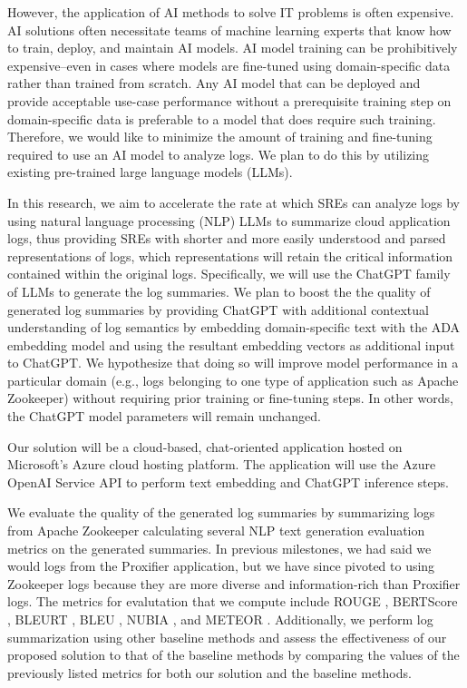 \documentclass[conference]{IEEEtran}
\begin{document}
However, the application of AI methods to solve IT problems is often expensive. \cite{LEE2023110689} \cite{network-log-anomaly-detection} AI solutions often necessitate teams of machine learning experts that know how to train, deploy, and maintain AI models. \cite{aiops-challenges} AI model training can be prohibitively expensive--even in cases where models are fine-tuned using domain-specific data rather than trained from scratch. Any AI model that can be deployed and provide acceptable use-case performance without a prerequisite training step on domain-specific data is preferable to a model that does require such training. Therefore, we would like to minimize the amount of training and fine-tuning required to use an AI model to analyze logs. We plan to do this by utilizing existing pre-trained large language models (LLMs).

In this research, we aim to accelerate the rate at which SREs can analyze logs by using natural language processing (NLP) LLMs to summarize cloud application logs, thus providing SREs with shorter and more easily understood and parsed representations of logs, which representations will retain the critical information contained within the original logs. \cite{medium-text-summarization} Specifically, we will use the ChatGPT family of LLMs to generate the log summaries. We plan to boost the the quality of generated log summaries by providing ChatGPT with additional contextual understanding of log semantics by embedding domain-specific text with the ADA embedding model and using the resultant embedding vectors as additional input to ChatGPT. We hypothesize that doing so will improve model performance in a particular domain (e.g., logs belonging to one type of application such as Apache Zookeeper) without requiring prior training or fine-tuning steps. In other words, the ChatGPT model parameters will remain unchanged.

Our solution will be a cloud-based, chat-oriented application hosted on Microsoft's Azure cloud hosting platform. The application will use the Azure OpenAI Service API to perform text embedding and ChatGPT inference steps.

We evaluate the quality of the generated log summaries by summarizing logs from Apache Zookeeper \cite{zookeeper} calculating several NLP text generation evaluation metrics on the generated summaries. In previous milestones, we had said we would logs from the Proxifier \cite{proxifier} application, but we have since pivoted to using Zookeeper logs because they are more diverse and information-rich than Proxifier logs. The metrics for evalutation that we compute include ROUGE \cite{lin2004rouge}, BERTScore \cite{bert-score}, BLEURT \cite{sellam2020bleurt}, BLEU \cite{10.3115/1073083.1073135}, NUBIA \cite{kane2020nubia}, and METEOR \cite{banerjee-lavie-2005-meteor}. Additionally, we perform log summarization using other baseline methods and assess the effectiveness of our proposed solution to that of the baseline methods by comparing the values of the previously listed metrics for both our solution and the baseline methods.
\end{document}
